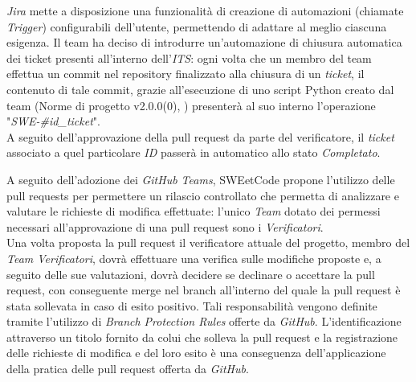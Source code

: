 \documentclass[10pt, a4paper]{article}
\begin{document}
 \textit{Jira} mette a disposizione una funzionalità di creazione di automazioni (chiamate \textit{Trigger}) configurabili dell'utente, permettendo di adattare al meglio ciascuna esigenza.
Il team ha deciso di introdurre un'automazione di chiusura automatica dei ticket presenti all'interno dell'\textit{ITS}: ogni volta che un membro del team 
effettua un commit nel repository finalizzato alla chiusura di un \textit{ticket}, il contenuto di tale commit, grazie all'esecuzione di uno script Python creato dal team (Norme di progetto v2.0.0(0), )
presenterà al suo interno l'operazione "\textit{SWE-\#id\_ticket}".\\
A seguito dell'approvazione della pull request da parte del verificatore, il \textit{ticket} associato a quel particolare \textit{ID} passerà in automatico
allo stato \textit{Completato}.

\label{sec:pull_request}
A seguito dell'adozione dei \textit{GitHub Teams}, SWEetCode propone l'utilizzo delle pull requests per permettere un rilascio controllato che permetta di analizzare 
e valutare le richieste di modifica effettuate: l'unico \textit{Team} dotato dei permessi necessari all'approvazione di una pull request sono i \textit{Verificatori}.\\
Una volta proposta la pull request il verificatore attuale del progetto, membro del \textit{Team Verificatori}, dovrà effettuare una verifica sulle modifiche proposte e,
a seguito delle sue valutazioni, dovrà decidere se declinare o accettare la pull request, con conseguente merge nel branch all'interno del quale la pull request è stata 
sollevata in caso di esito positivo.
Tali responsabilità vengono definite tramite l'utilizzo di \textit{Branch Protection Rules} offerte da \textit{GitHub}.
L'identificazione attraverso un titolo fornito da colui che solleva la pull request e la registrazione delle richieste di modifica e del loro esito è una conseguenza
dell'applicazione della pratica delle pull request offerta da \textit{GitHub}.
\end{document}
